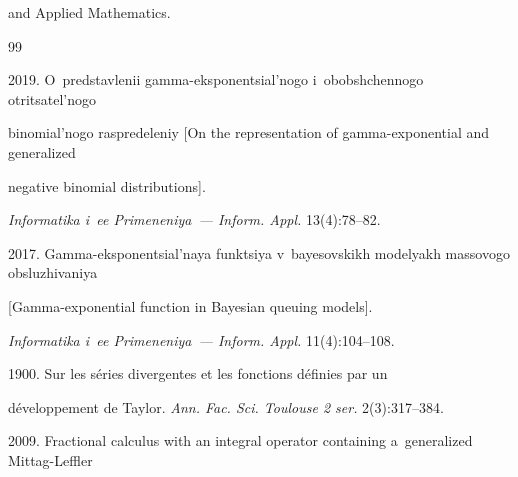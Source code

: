 and Applied Mathematics.













\renewcommand{\bibname}{\protect\rmfamily References}







{\small\frenchspacing


{%




\begin{thebibliography}{99}






 2019. O~predstavlenii gamma-eksponentsial'nogo i~obobshchennogo otritsatel'nogo 


 binomial'nogo raspredeleniy [On the representation of gamma-exponential and generalized 


 negative binomial distributions]. 


 \textit{Informatika i~ee Primeneniya~--- Inform. Appl.} 13(4):78--82.






 2017. Gamma-eksponentsial'naya funktsiya v~bayesovskikh modelyakh massovogo obsluzhivaniya 


 [Gamma-exponential function in Bayesian queuing models].


 \textit{Informatika i~ee Primeneniya~--- Inform. Appl.} 11(4):104--108.




 1900. Sur les s\'{e}ries divergentes et les fonctions d\'{e}finies par un


 d\'{e}veloppement de Taylor. \textit{Ann. Fac. Sci. Toulouse 2 ser.} 2(3):317--384.






 2009. Fractional calculus with an integral operator containing a~generalized Mittag-Leffler



\end{thebibliography}}}
